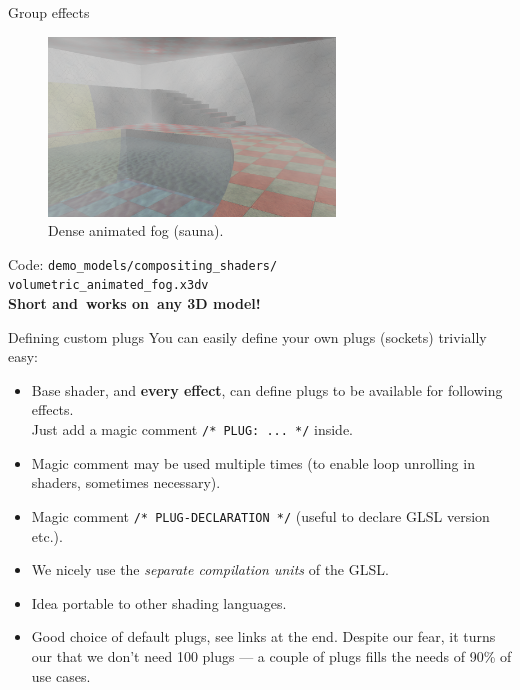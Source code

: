 \documentclass{beamer}
\begin{document}
\begin{frame}{Group effects}

\begin{figure}
  \centering
  \includegraphics[width=3in]{../volumetric_animated_fog_all}
  \caption{Dense animated fog (sauna).}
\end{figure}

Code: \texttt{demo\_models/compositing\_shaders/\\volumetric\_animated\_fog.x3dv}\\
\textbf{Short and~works on~any 3D model!}


\end{frame}

\begin{frame}{Defining custom plugs}
You can easily define your own plugs (sockets) trivially easy:
\begin{itemize}
  \item Base shader, and \textbf{every effect}, can define plugs
    to be available for following effects.\\
    Just add a magic comment \texttt{/* PLUG: ... */} inside.
  \item Magic comment may be used multiple times (to enable loop
    unrolling in shaders, sometimes necessary).
  \item Magic comment \texttt{/* PLUG-DECLARATION */}
    (useful to declare GLSL version etc.).
  \item We nicely use the \textit{separate compilation units} of the GLSL.
  \item Idea portable to other shading languages.
  \item Good choice of default plugs, see links at the end.
    Despite our fear, it turns our that we don't need 100 plugs
    --- a couple of plugs fills the needs of 90\% of use cases.
\end{itemize}
\end{frame}
\end{document}
